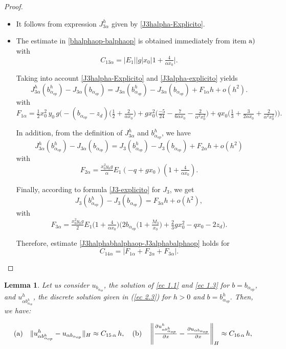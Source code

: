 \documentclass[11pt]{article}
\newcommand\pder[2][]{\ensuremath{\tfrac{\partial#1}{\partial#2}}}
\newtheorem{Lemma}{Lemma}
\begin{document}
\begin{proof} $ $
\begin{itemize}
\item[(a)] It follows from expression ${J^h_{3\alpha}}$ given by \eqref{J3halpha-Explicito}.

\item[(b)] The estimate in \eqref{bhalphaop-balphaop} is obtained immediately from item $\rm{a)}$ with $$C_{13\alpha}=|E_1| |g| x_0  \Big\lvert 1+\tfrac{4}{\alpha x_0}\Big\rvert.$$


Taking into account \eqref{J3halpha-Explicito} and \eqref{J3alpha-explicito} yields 
$${J^h_{3\alpha}}({b^h_{\alpha_{op}}})-J_{3\alpha}(b_{\alpha_{op}})=J_{3\alpha}({b^h_{\alpha_{op}}})-J_{3\alpha}(b_{\alpha_{op}})+F_{1\alpha}h+o(h^2).$$
with $$F_{1\alpha}=\tfrac{1}{2} x_0^2\,y_0 \,g\Big(- (b_{\alpha_{op}}-z_d) \Big(  \tfrac{1}{2} + \tfrac{2}{\alpha x_0}  \Big)
  + g x_0^2 \Big( \tfrac{-5 }{24} -  \tfrac{7 }{6 \alpha x_0} -  \tfrac{2 }{\alpha^2 x_0^2} \Big)
  + q x_0\Big(  \tfrac{1}{3} +  \tfrac{3 }{2 \alpha x_0} +  \tfrac{2}{\alpha^2 x_0^2}\Big) \Big).$$

In addition, from  the definition of ${ J^h_{3\alpha}}$ and ${b^h_{\alpha_{op}}}$, we have
$${ J^h_{3\alpha}}({b^h_{\alpha_{op}}})-J_{3\alpha}(b_{\alpha_{op}})=J_3({b^h_{\alpha_{op}}})-J_3(b_{\alpha_{op}})+F_{2\alpha}h+o(h^2)$$
with $$ F_{2\alpha}=\tfrac{x_0^2 y_0 g}{\alpha} E_1 (-q+gx_0)\left( 1+\tfrac{4}{\alpha x_0}\right).$$

Finally, according to formula \eqref{J3-explicito} for $J_3$, we get 
$$J_3({b^h_{\alpha_{op}}})-J_3(b_{\alpha_{op}})=F_{3\alpha}h+o(h^2),$$
with  $$F_{3\alpha}=\tfrac{x_0^2 y_0 g }{2} E_1 \Big( 1+\tfrac{4}{\alpha x_0}\Big)  \Big( 2b_{\alpha_{op}} \Big(1+ \tfrac{M_3}{x_0} \Big)+\tfrac{2}{3} g x_0^2-q x_0-2 z_d\Big).$$


Therefore,  estimate \eqref{J3halphabhalphaop-J3alphabalphaop} holds for 
$$
C_{14\alpha}=\Big\lvert F_{1\alpha}+F_{2\alpha}+F_{3\alpha}\Big\rvert. $$
\end{itemize}
\end{proof}


\begin{Lemma} Let us consider $u_{b_{\alpha_{op}}}$, the solution of \eqref{ec 1.1} and \eqref{ec 1.3} for $b= b_{\alpha_{op}}$, and
		${u^h_{\alpha b^h_{\alpha_{op}}}}$, the discrete solution  given in (\ref{ec 2.3}) for  $h>0$ and $b={b^h_{\alpha_{op}}}.$ Then, we have:
						
	 \begin{equation}  \label{difu-problema3alpha} {\rm (a)} \quad  			      
  				  \lVert {u^h_{\alpha b^h_{\alpha_{op}}}} - u_{\alpha b_{\alpha_{op}}}  \rVert _H \approx C_{15\,\alpha}\, h,
 \quad
     {\rm (b)}\quad
        \left\lVert \pder[{u^h_{\alpha b^h_{\alpha_{op}}}}]{x} - \pder[u_{\alpha b_{\alpha_{op}}}]{x} \right\rVert _H \approx C_{16\, \alpha} \,h,
\end{equation}
   \end{Lemma}
   
\end{document}

